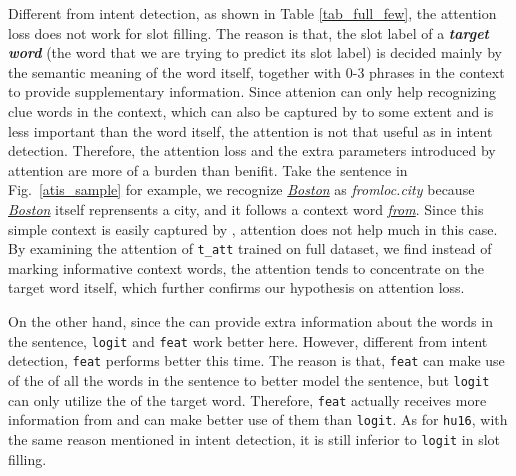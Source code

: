 Different from intent detection, as shown in Table \ref{tab_full_few}, the attention loss does not work for slot filling.
The reason is that, the slot label of a \textbf{\emph{target word}} (the word that we are trying to predict its slot label) is decided mainly by the semantic meaning of the word itself, together with 0-3 phrases in the context to provide supplementary information.
Since attenion can only help recognizing clue words in the context, which can also be captured by \BLSTM to some extent and is less important than the word itself, the attention is not that useful as in intent detection.
Therefore, the attention loss and the extra parameters introduced by attention are more of a burden than benifit.
Take the sentence in Fig.~\ref{atis_sample} for example, we recognize \textsl{\underline{Boston}} as \emph{fromloc.city} because \textsl{\underline{Boston}} itself reprensents a city, and it follows a context word \textsl{\underline{from}}. Since this simple context is easily
captured by \BLSTM, attention does not help much in this case.
By examining the attention of \texttt{t\_att} trained on full dataset,
we find instead of marking informative context words, the attention tends to concentrate on the target word itself, which
further confirms our hypothesis on attention loss.

On the other hand, since the \REtags can provide extra information about the words in the sentence, \texttt{logit} and \texttt{feat} work better here.
However, different from intent detection, \texttt{feat} performs better this time.
The reason is that, \texttt{feat} can make use of the \REtags of all the words in the sentence to better model the sentence, but \texttt{logit} can only utilize the \REtag of the target word.
Therefore, \texttt{feat} actually receives more information from \RE and can make better use of them than \texttt{logit}.
As for \texttt{hu16}, with the same reason mentioned in intent detection, it is still inferior to \texttt{logit} in slot filling.

